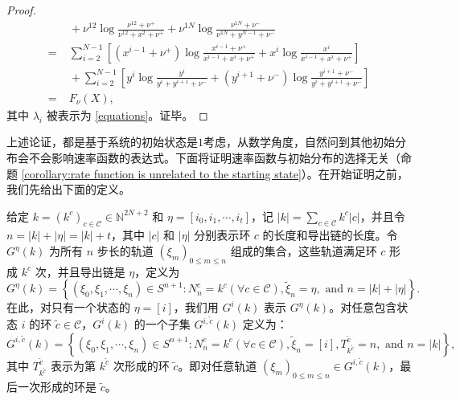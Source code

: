\begin{proof}
\begin{align*}
        &\;+\nu^{12}\log\frac{\nu^{12}+\nu^{+}}{\nu^{12}+x^{2}+\nu^{+}}+\nu^{1N}\log\frac{\nu^{1N}+\nu^{-}}{\nu^{1N}+y^{N-1}+\nu^{-}}\\
        =&\;\sum_{i=2}^{N-1}\left[ \left(x^{i-1}+\nu^+\right)\log\frac{x^{i-1}+\nu^+}{x^{i-1}+x^{i}+\nu^+} + x^{i}\log\frac{x^{i}}{x^{i-1}+x^{i}+\nu^+}  \right]\\
        &\;+\sum_{i=2}^{N-1}  \left[y^{i}\log\frac{y^{i}}{y^{i} +y^{i+1} +\nu^-} + \left(y^{i+1} +\nu^-\right)\log\frac{y^{i+1} +\nu^-}{y^{i} +y^{i+1} +\nu^-}\right]\\
        =&\;F_{\nu}(X),
        \end{align*}
        其中 $\lambda_i$ 被表示为 \eqref{equations}。证毕。
\end{proof}


上述论证，都是基于系统的初始状态是$1$考虑，从数学角度，自然问到其他初始分布会不会影响速率函数的表达式。下面将证明速率函数与初始分布的选择无关（命题 \ref{corollary:rate function is unrelated to the starting state}）。在开始证明之前，我们先给出下面的定义。

给定 $k=(k^c)_{c\in\mathcal{C}}\in \mathbb{N}^{2N+2}$ 和 $\eta=[i_0,i_1,\cdots,i_t]$，记 $|k|=\sum_{c\in\mathcal{C}}k^c|c|$，并且令 $n=|k|+|\eta|=|k|+t$，其中 $|c|$ 和 $|\eta|$ 分别表示环 $c$ 的长度和导出链的长度。令 $G^{\eta}(k)$ 为所有 $n$ 步长的轨道 $(\xi_m)_{0\le m\le n}$ 组成的集合，这些轨道满足环 $c$ 形成 $k^c$ 次，并且导出链是 $\eta$，定义为
\begin{equation*}
	G^{\eta}(k)=\left\{(\xi_0,\xi_1,\cdots,\xi_n)\in S^{n+1}:N^c_n=k^c (\forall c\in \mathcal{C}),\tilde{\xi}_n=\eta,\text{ and }n=|k|+|\eta|\right\}.
\end{equation*}
在此，对只有一个状态的 $\eta =[i]$，我们用 $G^{i}(k)$ 表示 $G^{\eta}(k)$。对任意包含状态 $i$ 的环 $\tilde{c}\in \mathcal{C}$，$G^i(k)$ 的一个子集 $G^{i,\tilde{c}}(k)$ 定义为：
\begin{equation*}
	G^{i,\tilde{c}}(k)=\left\{(\xi_0,\xi_1,\cdots,\xi_n)\in S^{n+1}:N^c_n=k^c (\forall c\in \mathcal{C}),\tilde{\xi}_n=[i],T^{\tilde{c}}_{k^{\tilde{c}}}=n,\text{ and }n=|k|\right\},
\end{equation*}
其中 $T^{\tilde{c}}_{k^{\tilde{c}}}$ 表示为第 $k^{\tilde{c}}$ 次形成的环 $\tilde{c}$。即对任意轨道 $(\xi_m)_{0\le m\le n}\in G^{i,\tilde{c}}(k)$，最后一次形成的环是 $\tilde{c}$。

